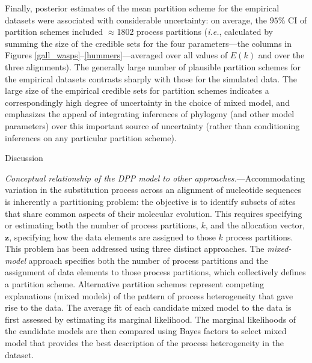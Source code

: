 \documentclass[11pt]{article}
\begin{document}
Finally, posterior estimates of the mean partition scheme for the empirical datasets were associated with considerable uncertainty: on average, the $95\%$ CI of partition schemes included $\approx$1802 process partitions ({\it i.e.}, calculated by summing the size of the credible sets for the four parameters---the columns in Figures \ref{gall_wasps}--\ref{hummers}---averaged over all values of $E(k)$ and over the three alignments).  
The generally large number of plausible partition schemes for the empirical datasets contrasts sharply with those for the simulated data. 
The large size of the empirical credible sets for partition schemes indicates a correspondingly high degree of uncertainty in the choice of mixed model, and emphasizes the appeal of integrating inferences of phylogeny (and other model parameters) over this important source of uncertainty (rather than conditioning inferences on any particular partition scheme).

\newpage

\begin{center}
{\sc Discussion}
\end{center}

\bigskip
\noindent
{\it Conceptual relationship of the DPP model to other approaches.}---Accommodating variation in the substitution process across an alignment of nucleotide sequences is inherently a partitioning problem:
the objective is to identify subsets of sites that share common aspects of their molecular evolution.
This requires specifying or estimating both the number of process partitions, $k$, and the allocation vector, ${\mathbf z}$, specifying how the data elements are assigned to those $k$ process partitions.
This problem has been addressed using three distinct approaches.
The \emph{mixed-model} approach \citep[{\it e.g.},][]{ronquist03} specifies both the number of process partitions and the assignment of data elements to those process partitions, which collectively defines a partition scheme.
Alternative partition schemes represent competing explanations (mixed models) of the pattern of process heterogeneity that gave rise to the data.
The average fit of each candidate mixed model to the data is first assessed by estimating its marginal likelihood.
The marginal likelihoods of the candidate models are then compared using Bayes factors to select mixed model that provides the best description of the process heterogeneity in the dataset.
\end{document}
